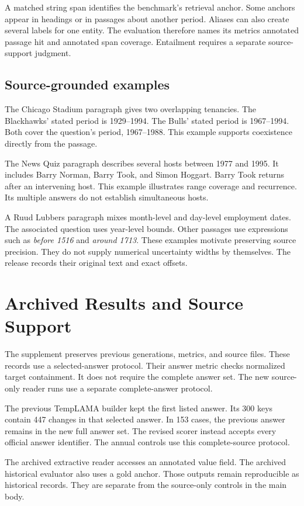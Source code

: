 A matched string span identifies the benchmark's retrieval anchor.
Some anchors appear in headings or in passages about another period.
Aliases can also create several labels for one entity.
The evaluation therefore names its metrics annotated passage hit and annotated span coverage.
Entailment requires a separate source-support judgment.

\subsection{Source-grounded examples}
The Chicago Stadium paragraph gives two overlapping tenancies.
The Blackhawks' stated period is 1929--1994.
The Bulls' stated period is 1967--1994.
Both cover the question's period, 1967--1988.
This example supports coexistence directly from the passage.

The News Quiz paragraph describes several hosts between 1977 and 1995.
It includes Barry Norman, Barry Took, and Simon Hoggart.
Barry Took returns after an intervening host.
This example illustrates range coverage and recurrence.
Its multiple answers do not establish simultaneous hosts.

A Ruud Lubbers paragraph mixes month-level and day-level employment dates.
The associated question uses year-level bounds.
Other passages use expressions such as \emph{before 1516} and \emph{around 1713}.
These examples motivate preserving source precision.
They do not supply numerical uncertainty widths by themselves.
The release records their original text and exact offsets.

\section{Archived Results and Source Support}
\label{app:archive}
The supplement preserves previous generations, metrics, and source files.
These records use a selected-answer protocol.
Their answer metric checks normalized target containment.
It does not require the complete answer set.
The new source-only reader runs use a separate complete-answer protocol.

The previous TempLAMA builder kept the first listed answer.
Its 300 keys contain 447 changes in that selected answer.
In 153 cases, the previous answer remains in the new full answer set.
The revised scorer instead accepts every official answer identifier.
The annual controls use this complete-source protocol.

The archived extractive reader accesses an annotated value field.
The archived historical evaluator also uses a gold anchor.
Those outputs remain reproducible as historical records.
They are separate from the source-only controls in the main body.

